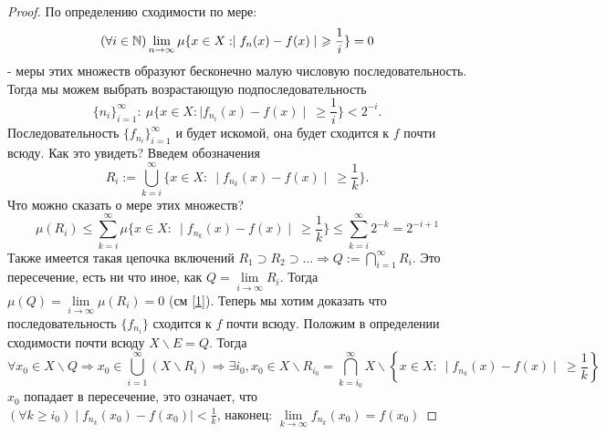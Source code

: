 \begin{proof}
По определению сходимости по мере: $$(\forall i \in \N) \lim_{n\to\infty} \mu \{ x\in X: \mid f_n(x)-f(x)\mid \ \geqslant \frac{1}{i} \} =0$$ - меры этих множеств образуют бесконечно малую числовую последовательность. Тогда мы можем выбрать возрастающую подпоследовательность $$\{n_i\}^\infty_{i=1}:\  \mu \{ x\in X: \mid f_{n_i}(x)-f(x)\mid \ \geqslant \frac{1}{i} \} < 2^{-i}.$$
Последовательность $\{f_{n_i}\}^\infty_{i=1}$ и будет искомой, она будет сходится к $f$ почти всюду. Как это увидеть? Введем обозначения $$R_i:= \bigcup ^\infty_{k=i} \{x\in X:\ \mid f_{n_k}(x)-f(x)\mid \ \geqslant \frac{1}{k}\}.$$ Что можно сказать о мере этих множеств?
\begin{equation}\label{1}
    \mu (R_i) \leqslant \sum_{k=i}^{\infty} \mu \{x\in X:\ \mid f_{n_k}(x)-f(x)\mid \ \geqslant \frac{1}{k}\} \leqslant \sum_{k=i}^{\infty} 2^{-k}=2^{-i+1}
\end{equation}
Также имеется такая цепочка включений $R_1\supset R_2 \supset \ldots \Rightarrow Q:=\bigcap\limits_{i=1}^\infty R_i$. Это пересечение, есть ни что иное, как $Q=\lim\limits_{i\to\infty}R_i$. Тогда $\mu(Q)=\lim\limits_{i\to\infty} \mu(R_i)=0$ (см \ref{1}).
\newpage Теперь мы хотим доказать что последовательность $\{f_{n_i}\}$ сходится к $f$ почти всюду. Положим в определении сходимости почти всюду $X\backslash E = Q$.
Тогда $$\forall x_0 \in X\backslash Q \Rightarrow x_0 \in \bigcup^\infty_{i=1}(X\backslash R_i) \Rightarrow \exists i_0, x_0 \in X\backslash R_{i_0} = \bigcap^\infty_{k=i_0} X\backslash \left\{x\in X:\ \mid f_{n_k}(x)-f(x)\mid \ \geqslant \frac{1}{k}\right\}$$
$x_0$ попадает в пересечение, это означает, что $(\forall k \geqslant i_0) \mid f_{n_k}(x_0)-f(x_0)\mid < \frac{1}{k}$, наконец: ${\lim\limits_{k\to\infty}f_{n_k}(x_0)=f(x_0)}$
\end{proof}

